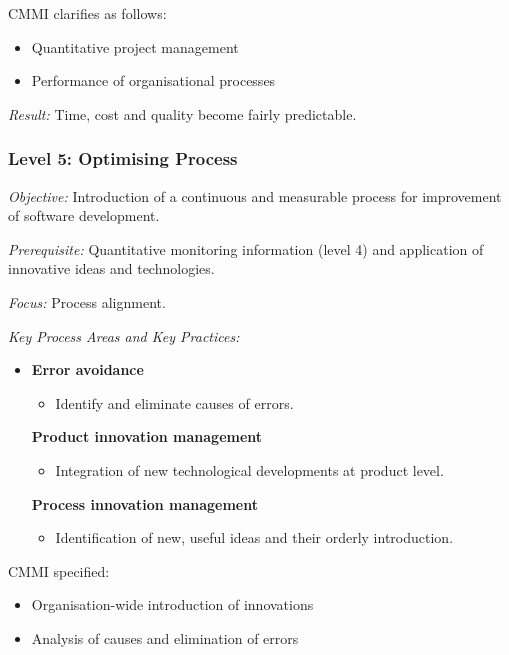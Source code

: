 \documentclass[11pt,a4paper]{article}
\begin{document}
CMMI clarifies as follows:
\begin{itemize}
\item Quantitative project management
\item Performance of organisational processes
\end{itemize}

\emph{Result:} Time, cost and quality become fairly predictable.

\subsubsection*{Level 5: Optimising Process}

\emph{Objective:} Introduction of a continuous and measurable process for
improvement of software development.

\emph{Prerequisite:} Quantitative monitoring information (level 4) and
application of innovative ideas and technologies.

\emph{Focus:} Process alignment.

\emph{Key Process Areas and Key Practices:}
\begin{itemize}
\item \textbf{Error avoidance}
  \begin{itemize}
  \item Identify and eliminate causes of errors.
  \end{itemize}
\textbf{Product innovation management}
  \begin{itemize}
  \item Integration of new technological developments at product level.  
  \end{itemize}
\textbf{Process innovation management}
  \begin{itemize}
  \item Identification of new, useful ideas and their orderly introduction.
  \end{itemize}
\end{itemize}
CMMI specified:
\begin{itemize}
\item Organisation-wide introduction of innovations
\item Analysis of causes and elimination of errors
\end{itemize}
\end{document}
